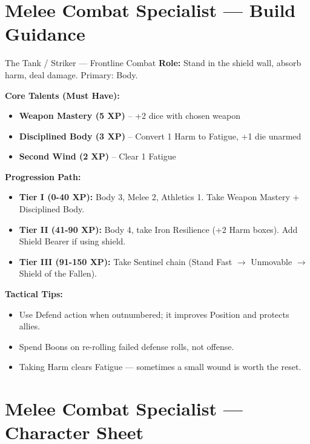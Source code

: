 \documentclass[10pt]{article}
\begin{document}
\section*{Melee Combat Specialist --- Build Guidance}

\begin{tipbox}{The Tank / Striker --- Frontline Combat}
    \textbf{Role:} Stand in the shield wall, absorb harm, deal damage. Primary: Body.
    
    \textbf{Core Talents (Must Have):}
    \begin{itemize}
        \item \textbf{Weapon Mastery (5 XP)} -- +2 dice with chosen weapon
        \item \textbf{Disciplined Body (3 XP)} -- Convert 1 Harm to Fatigue, +1 die unarmed
        \item \textbf{Second Wind (2 XP)} -- Clear 1 Fatigue
    \end{itemize}
    
    \textbf{Progression Path:}
    \begin{itemize}
        \item \textbf{Tier I (0-40 XP):} Body 3, Melee 2, Athletics 1. Take Weapon Mastery + Disciplined Body.
        \item \textbf{Tier II (41-90 XP):} Body 4, take Iron Resilience (+2 Harm boxes). Add Shield Bearer if using shield.
        \item \textbf{Tier III (91-150 XP):} Take Sentinel chain (Stand Fast $\rightarrow$ Unmovable $\rightarrow$ Shield of the Fallen).
    \end{itemize}
    
    \textbf{Tactical Tips:}
    \begin{itemize}
        \item Use Defend action when outnumbered; it improves Position and protects allies.
        \item Spend Boons on re-rolling failed defense rolls, not offense.
        \item Taking Harm clears Fatigue --- sometimes a small wound is worth the reset.
    \end{itemize}
\end{tipbox}

\newpage

\section*{Melee Combat Specialist --- Character Sheet}
\end{document}
